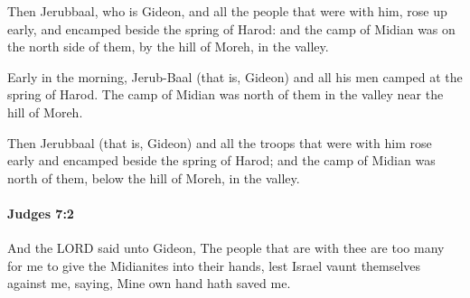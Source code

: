			\begin{versebox}
					\item[BHS] 
					\item[ASV] Then Jerubbaal, who is Gideon, and all the people that were with him, rose up early, and encamped beside the spring of Harod: and the camp of Midian was on the north side of them, by the hill of Moreh, in the valley.
					\item[NIV] Early in the morning, Jerub-Baal (that is, Gideon) and all his men camped at the spring of Harod. The camp of Midian was north of them in the valley near the hill of Moreh.
					\item[NRSV] Then Jerubbaal (that is, Gideon) and all the troops that were with him rose early and encamped beside the spring of Harod; and the camp of Midian was north of them, below the hill of Moreh, in the valley.
			\end{versebox}

		\paragraph{Judges 7:2} %
			\label{JUDGES-7-2}

			And the LORD said unto Gideon, The people that are with thee are too many for me to give the Midianites into their hands, lest Israel vaunt themselves against me, saying, Mine own hand hath saved me.

